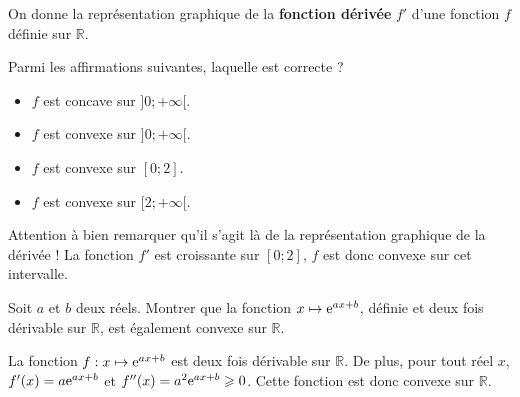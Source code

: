 \documentclass[11pt,fleqn, openany]{book} %
\begin{document}
\begin{exercise}On donne la représentation graphique de la \textbf{fonction dérivée} $f'$ d'une fonction $f$ définie sur $\mathbb{R}$. 

\begin{minipage}{0.6\linewidth}
Parmi les affirmations suivantes, laquelle est correcte ?
\begin{itemize}
\item $f$ est concave sur $]0;+\infty[$.
\item $f$ est convexe sur $]0;+\infty[$.
\item $f$ est convexe sur $[0;2]$.
\item $f$ est convexe sur $[2;+\infty[$.
\end{itemize}
\end{minipage}\hfill\begin{minipage}{0.35\linewidth}
\begin{center}
\end{center}
\end{minipage}
\end{exercise}

\begin{solution}Attention à bien remarquer qu'il s'agit là de la représentation graphique de la dérivée ! La fonction $f'$ est croissante sur $[0;2]$, $f$ est donc convexe sur cet intervalle.\end{solution}




\begin{exercise}Soit $a$ et $b$ deux réels. Montrer que la fonction $x\mapsto \mathrm{e}^{ax+b}$, définie et deux fois dérivable sur $\mathbb{R}$,  est également convexe sur $\mathbb{R}$.\end{exercise}

\begin{solution}La fonction  \(f:x\mapsto \mathrm{e}^{ax+b}\) est deux fois dérivable sur \(\mathbb{R}\). De plus, pour tout réel \(x\), \(f'(x)=a\mathrm{e}^{ax+b}\) et \(f^{\prime\prime}(x)=a^2\mathrm{e}^{ax+b}\geqslant 0\). Cette fonction est donc convexe sur \(\mathbb{R}\).\end{solution}
\end{document}
